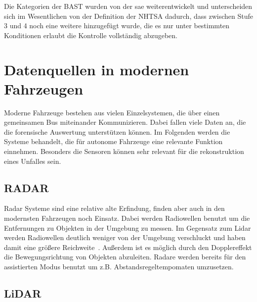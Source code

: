 \documentclass[conference,compsoc,final,a4paper]{IEEEtran}
\begin{document}
Die Kategorien der \ac{BAST} wurden von der \ac{sae} weiterentwickelt\cite{bast2021} und unterscheiden sich im Wesentlichen von der Definition der \ac{NHTSA} dadurch, dass zwischen Stufe 3 und 4 noch eine weitere hinzugefügt wurde, die es nur unter bestimmten Konditionen erlaubt die Kontrolle vollständig abzugeben\cite{SAE2021}.

\section{Datenquellen in modernen Fahrzeugen}

Moderne Fahrzeuge bestehen aus vielen Einzelsystemen, die über einen gemeinsamen Bus miteinander Kommunizieren.
Dabei fallen viele Daten an, die die forensische Auswertung unterstützen können. Im Folgenden werden die Systeme behandelt,
die für autonome Fahrzeuge eine relevante Funktion einnehmen.
Besonders die Sensoren können sehr relevant für die rekonstruktion eines Unfalles sein.

\subsection{RADAR}

Radar Systeme sind eine relative alte Erfindung, finden aber auch in den modernsten Fahrzeugen noch Einsatz.
Dabei werden Radiowellen benutzt um die Entfernungen zu Objekten in der Umgebung zu messen.
Im Gegensatz zum Lidar werden Radiowellen deutlich weniger von der Umgebung verschluckt und haben damit eine
größere Reichweite~\cite{Neal2018}. Außerdem ist es möglich durch den Dopplereffekt die Bewegungsrichtung von Objekten abzuleiten.
Radare werden bereits für den assistierten Modus benutzt um z.B. Abstandsregeltempomaten umzusetzen.

\subsection{LiDAR}
\end{document}
